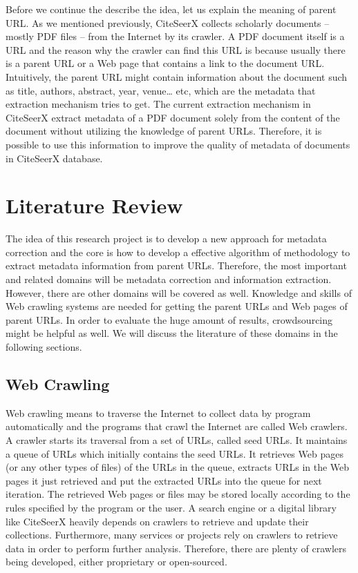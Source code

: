 \documentclass[prodmode]{acmsmall} %
\begin{document}
Before we continue the describe the idea, let us explain the meaning of parent URL. As we mentioned previously, CiteSeerX collects scholarly documents -- mostly PDF files -- from the Internet by its crawler. A PDF document itself is a URL and the reason why the crawler can find this URL is because usually there is a parent URL or a Web page that contains a link to the document URL. Intuitively, the parent URL might contain information about the document such as title, authors, abstract, year, venue… etc, which are the metadata that extraction mechanism tries to get. The current extraction mechanism in CiteSeerX extract metadata of a PDF document solely from the content of the document without utilizing the knowledge of parent URLs. Therefore, it is possible to use this information to improve the quality of metadata of documents in CiteSeerX database.

\section{Literature Review}

The idea of this research project is to develop a new approach for metadata correction and the core is how to develop a effective algorithm of methodology to extract metadata information from parent URLs. Therefore, the most important and related domains will be metadata correction and information extraction. However, there are other domains will be covered as well. Knowledge and skills of Web crawling systems are needed for getting the parent URLs and Web pages of parent URLs. In order to evaluate the huge amount of results, crowdsourcing might be helpful as well. We will discuss the literature of these domains in the following sections. 

\subsection{Web Crawling}

Web crawling means to traverse the Internet to collect data by program automatically and the programs that crawl the Internet are called Web crawlers. A crawler starts its traversal from a set of URLs, called seed URLs. It maintains a queue of URLs which initially contains the seed URLs. It retrieves Web pages (or any other types of files) of the URLs in the queue, extracts URLs in the Web pages it just retrieved and put the extracted URLs into the queue for next iteration. The retrieved Web pages or files may be stored locally according to the rules specified by the program or the user. A search engine or a digital library like CiteSeerX heavily depends on crawlers to retrieve and update their collections. Furthermore, many services or projects rely on crawlers to retrieve data in order to perform further analysis. Therefore, there are plenty of crawlers being developed, either proprietary or open-sourced.
\end{document}
